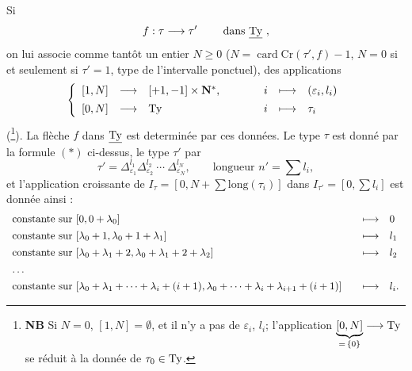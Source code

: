 Si
\[
f : \tau \longrightarrow \tau' \qquad \ \text{dans } \underline{\mathrm{Ty}}\ ,
\]
on lui associe comme tantôt un entier \underline{$N \geq 0$} ($N = \operatorname{card}\mathrm{Cr}(\tau', f){-}1$, $N = 0$ si et seulement si $\tau' = 1$, type de l'intervalle ponctuel), des applications
\[
\left\{
\begin{array}{lcl@{\qquad\qquad}ccl}
{[1,N]} & \longrightarrow & [+1,-1] \times \mathbf{N}^*, & i & \longmapsto & (\varepsilon_i, l_i) \\[1ex]
{[0,N]} & \longrightarrow & \Ty & i & \longmapsto & \tau_i
\end{array}
\right.
\]
(\footnote[14]{\textbf{NB} Si $N = 0$, $[1,N] = \emptyset$, et il n'y a pas de $\varepsilon_i$, $l_i$; l'application $\underbrace{[0,N]}_{=\,\{0\}} \longrightarrow \mathrm{Ty}$ se réduit à la donnée de $\tau_0 \in \mathrm{Ty}$.}). La flèche $f$ dans $\underline{\mathrm{Ty}}$ est determinée par ces données. Le type $\tau$ est donné par la formule $(*)$ ci-dessus, le type $\tau'$ par %
\[
\tau' = \Delta^{l_1}_{\varepsilon_1} \Delta^{l_2}_{\varepsilon_2}\ \cdots\ \Delta^{l_N}_{\varepsilon_N}, \qquad \text{longueur } n' = \textstyle\sum l_i, \tag*{$(*')$}
\]
et l'application croissante de $I_\tau = [0, N + \sum \mathrm{long}(\tau_i)]$ dans $I_{\tau'} = [0, \sum l_i]$ est donnée ainsi :
\[
\begin{array}{l@{\qquad}cl}
\text{constante sur } [0, 0+\lambda_0] & \longmapsto & 0 \\[1ex]
\text{constante sur } [\lambda_0+1, \lambda_0+1+\lambda_1] & \longmapsto & l_1 \\[1ex]
\text{constante sur } [\lambda_0+\lambda_1+2, \lambda_0+\lambda_1+2+\lambda_2] & \longmapsto & l_2 \\[1ex]
\ldots & & \\[1ex]
\text{constante sur } [\lambda_0+\lambda_1+\cdots+\lambda_i+(i+1), \lambda_0+\cdots+\lambda_i+\lambda_{i+1}+(i+1)] & \longmapsto & l_i.
\end{array}
\]


